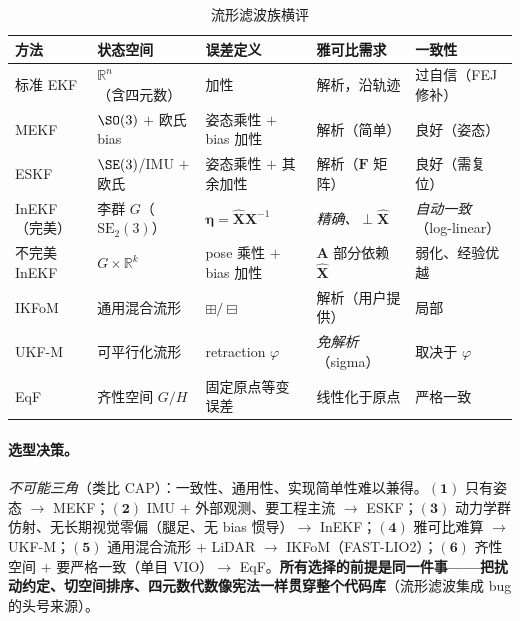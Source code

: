 \begin{table}[H]\centering\small
\caption{流形滤波族横评}
\label{tab:family-compare}
\begin{tabular}{lllll}
\toprule
方法 & 状态空间 & 误差定义 & 雅可比需求 & 一致性 \\
\midrule
标准 EKF & $\mathbb{R}^n$（含四元数） & 加性 & 解析，沿轨迹 & 过自信（FEJ 修补） \\
MEKF & $\SO(3)$ $+$ 欧氏 bias & 姿态乘性 $+$ bias 加性 & 解析（简单） & 良好（姿态） \\
ESKF & $\SE(3)$/IMU $+$ 欧氏 & 姿态乘性 $+$ 其余加性 & 解析（$\mathbf{F}$ 矩阵） & 良好（需复位） \\
InEKF（完美） & 李群 $G$（$\mathrm{SE}_2(3)$） & $\boldsymbol{\eta}=\hat{\mathbf{X}}\mathbf{X}^{-1}$ & \emph{精确、$\perp\hat{\mathbf{X}}$} & \emph{自动一致}（log-linear） \\
不完美 InEKF & $G\times\mathbb{R}^k$ & pose 乘性 $+$ bias 加性 & $\mathbf{A}$ 部分依赖 $\hat{\mathbf{X}}$ & 弱化、经验优越 \\
IKFoM & 通用混合流形 & $\boxplus/\boxminus$ & 解析（用户提供） & 局部 \\
UKF-M & 可平行化流形 & retraction $\varphi$ & \emph{免解析}（sigma） & 取决于 $\varphi$ \\
EqF & 齐性空间 $G/H$ & 固定原点等变误差 & 线性化于原点 & 严格一致 \\
\bottomrule
\end{tabular}
\end{table}

\paragraph{选型决策。}\emph{不可能三角}（类比 CAP）：一致性、通用性、实现简单性难以兼得。$\mathbf{(1)}$ 只有姿态 $\to$ MEKF；$\mathbf{(2)}$ IMU $+$ 外部观测、要工程主流 $\to$ ESKF；$\mathbf{(3)}$ 动力学群仿射、无长期视觉零偏（腿足、无 bias 惯导）$\to$ InEKF；$\mathbf{(4)}$ 雅可比难算 $\to$ UKF-M；$\mathbf{(5)}$ 通用混合流形 $+$ LiDAR $\to$ IKFoM（FAST-LIO2）；$\mathbf{(6)}$ 齐性空间 $+$ 要严格一致（单目 VIO）$\to$ EqF。\textbf{所有选择的前提是同一件事——把扰动约定、切空间排序、四元数代数像宪法一样贯穿整个代码库}（流形滤波集成 bug 的头号来源）。

